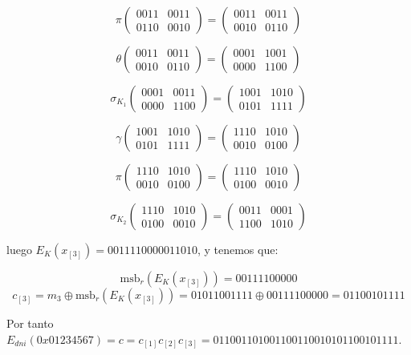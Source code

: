 \documentclass[a4paper]{article}
\begin{document}
$$\pi \begin{pmatrix} 0011 & 0011 \\ 0110 & 0010 \end{pmatrix} = \begin{pmatrix} 0011 & 0011 \\ 0010 & 0110 \end{pmatrix}$$

$$\theta \begin{pmatrix} 0011 & 0011 \\ 0010 & 0110 \end{pmatrix} = \begin{pmatrix} 0001 & 1001 \\ 0000 & 1100 \end{pmatrix}$$

$$\sigma_{K_1} \begin{pmatrix} 0001 & 0011 \\ 0000 & 1100 \end{pmatrix} = \begin{pmatrix} 1001 & 1010 \\ 0101 & 1111 \end{pmatrix}$$

$$\gamma \begin{pmatrix} 1001 & 1010 \\ 0101 & 1111 \end{pmatrix} = \begin{pmatrix} 1110 & 1010 \\ 0010 & 0100 \end{pmatrix}$$

$$\pi \begin{pmatrix} 1110 & 1010 \\ 0010 & 0100 \end{pmatrix} = \begin{pmatrix} 1110 & 1010 \\ 0100 & 0010 \end{pmatrix}$$

$$\sigma_{K_2} \begin{pmatrix} 1110 & 1010 \\ 0100 & 0010 \end{pmatrix} = \begin{pmatrix} 0011 & 0001 \\ 1100 & 1010 \end{pmatrix}$$


luego $E_K(x_{[3]}) = 0011 1100 0001 1010$, y tenemos que:

$$\text{msb}_r (E_K(x_{[3]})) = 0011 1100 000$$
$$c_{[3]} = m_3 \oplus \text{msb}_r(E_K(x_{[3]})) = 0101 1001 111 \oplus 0011 1100 000 = 0110 0101 111$$

Por tanto $E_{dni} (0x01234567) = c = c_{[1]}c_{[2]}c_{[3]} = 0110 0110 100 1100 1100 101 0110 0101 111$.
\end{document}
